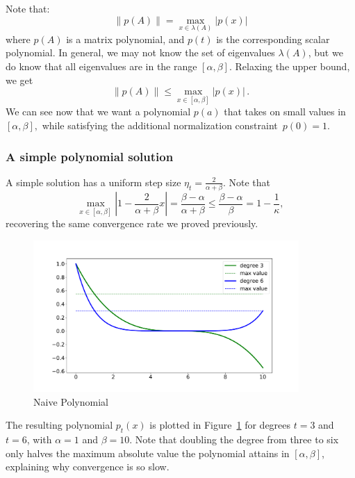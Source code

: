 Note that:
\begin{equation*}
\left\|p(A)\right\| = \max_{x \in \lambda(A)} \left|p(x)\right|
\end{equation*}
where $p(A)$ is a matrix polynomial, and $p(t)$ is the corresponding scalar
polynomial. In general, we may not know the set of eigenvalues $\lambda(A)$, but
we do know that all eigenvalues are in the range $[\alpha, \beta].$ Relaxing
the upper bound, we get
\begin{equation*}
\left\|p(A)\right\| \le \max_{x \in [\alpha, \beta]} \left|p(x)\right|\,.
\end{equation*}
We can see now that we
want a polynomial $p(a)$ that takes on small values in $[\alpha, \beta],$ while 
satisfying the additional normalization constraint~$p(0) = 1.$ 

\subsubsection{A simple polynomial solution}
A simple solution has a uniform step size $\eta_t = \frac{2}{\alpha + \beta}$. 
Note that
\[
\max_{x \in [\alpha, \beta]} \left|1 - \frac{2}{\alpha + \beta} x\right| 
= \frac{\beta - \alpha}{\alpha + \beta} \leq \frac{\beta-\alpha}{\beta} =
1-\frac1\kappa,
\]
recovering the same convergence rate we proved previously.
\begin{figure}[h]
\includegraphics[width=0.9\textwidth]{figures/lecture6-naive_polynome.pdf}
\centering
\caption{Naive Polynomial}
\label{naive_p}
\end{figure}
%
The resulting polynomial $p_t(x)$ is plotted in Figure~\ref{naive_p} for degrees
$t = 3$ and $t = 6$, with $\alpha = 1$ and $\beta = 10$. Note that doubling the
degree from three to six only halves the maximum absolute value the polynomial
attains in $[\alpha,\beta]$, explaining why convergence is so slow.

